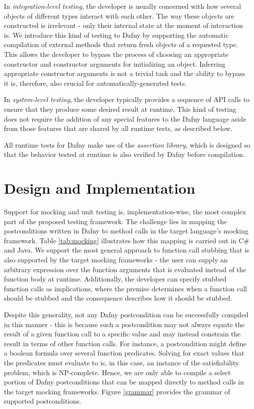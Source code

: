 \documentclass[runningheads]{llncs}
\begin{document}
In \textit{integration-level testing}, the developer is usually concerned with how several objects of different types interact with each other. 
The way these objects are constructed is irrelevant - only their internal state at the moment of interaction is. 
We introduce this kind of testing to Dafny by supporting the automatic compilation of external methods that return fresh objects of a requested type. 
This allows the developer to bypass the process of choosing an appropriate constructor and constructor arguments for initializing an object. 
Inferring appropriate constructor arguments is not a trivial task and the ability to bypass it is, therefore, also crucial for automatically-generated tests.

In \textit{system-level testing}, the developer typically provides a sequence of API calls to ensure that they produce some desired result at runtime. 
This kind of testing does not require the addition of any special features to the Dafny language aside from those features that are shared by all runtime tests, as described below. 

All runtime tests for Dafny make use of the \textit{assertion library}, which is designed so that the behavior tested at runtime is also verified by Dafny before compilation. 


\section{Design and Implementation}
\label{sec:design}

Support for mocking and unit testing is, implementation-wise, the most complex part of the proposed testing framework. 
The challenge lies in mapping the postconditions written in Dafny to method calls in the target language's mocking framework. Table \ref{tab:mocking} illustrates how this mapping is carried out in C\# and Java. 
We support the most general approach to function call stubbing that is also supported by the target mocking frameworks - the user can supply an arbitrary expression over the function arguments that is evaluated instead of the function body at runtime. 
Additionally, the developer can specify stubbed function calls as implications, where the premise determines when a function call should be stubbed and the consequence describes how it should be stubbed. 

Despite this generality, not any Dafny postcondition can be successfully compiled in this manner - this is because such a postcondition may not always equate the result of a given function call to a specific value and may instead constrain the result in terms of other function calls.
For instance, a postcondition might define a boolean formula over several function predicates. 
Solving for exact values that the predicates must evaluate to is, in this case, an instance of the satisfiability problem, which is NP-complete.
Hence, we are only able to compile a select portion of Dafny postconditions that can be mapped directly to method calls in the target mocking frameworks. 
Figure \ref{grammar} provides the grammar of supported postconditions.
\end{document}
